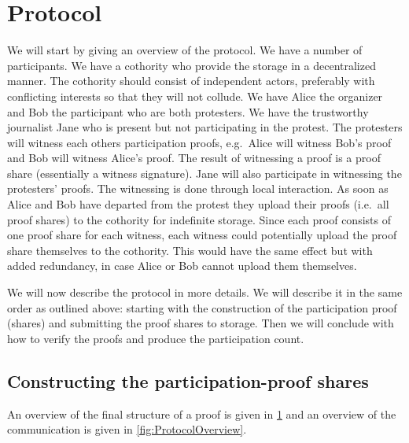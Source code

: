\section{Protocol}

We will start by giving an overview of the protocol.
We have a number of participants.
We have a cothority who provide the storage in a decentralized manner.
The cothority should consist of independent actors, preferably with conflicting 
interests so that they will not collude.
We have Alice the organizer and Bob the participant who are both protesters.
We have the trustworthy journalist Jane who is present but not participating in 
the protest.
The protesters will witness each others participation proofs, e.g.\ Alice will 
witness Bob's proof and Bob will witness Alice's proof.
The result of witnessing a proof is a proof share (essentially a witness 
signature).
Jane will also participate in witnessing the protesters' proofs.
The witnessing is done through local interaction.
As soon as Alice and Bob have departed from the protest they upload their proofs 
(i.e.\ all proof shares) to the cothority for indefinite storage.
Since each proof consists of one proof share for each witness, each witness 
could potentially upload the proof share themselves to the cothority.
This would have the same effect but with added redundancy, in case Alice or Bob 
cannot upload them themselves.

We will now describe the protocol in more details.
We will describe it in the same order as outlined above:
starting with the construction of the participation proof (shares) and 
submitting the proof shares to storage.
Then we will conclude with how to verify the proofs and produce the 
participation count.

\subsection{Constructing the participation-proof shares}

An overview of the final structure of a proof is given in \cref{fig:ProofFig} 
and an overview of the communication is given in \cref{fig:ProtocolOverview}.

\begin{frame}
\begin{figure}
  \centering
  \label{fig:ProofFig}
\end{figure}
\end{frame}

